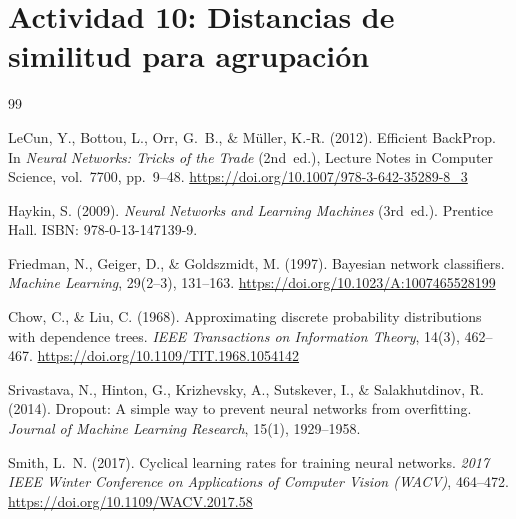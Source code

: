 \documentclass[12pt,a4paper]{article}
\theoremstyle{definition}
\theoremstyle{plain}
\theoremstyle{remark}
\begin{document}
\section{Actividad 10: Distancias de similitud para agrupación}


\clearpage


\begin{thebibliography}{99}


LeCun, Y., Bottou, L., Orr, G.~B., \& M\"uller, K.-R. (2012).
Efficient BackProp.
In \emph{Neural Networks: Tricks of the Trade} (2nd~ed.), Lecture Notes in Computer Science, vol.~7700, pp.~9--48.
\url{https://doi.org/10.1007/978-3-642-35289-8\_3}

Haykin, S. (2009).
\emph{Neural Networks and Learning Machines} (3rd~ed.).
Prentice Hall.
ISBN: 978-0-13-147139-9.

Friedman, N., Geiger, D., \& Goldszmidt, M. (1997).
Bayesian network classifiers.
\emph{Machine Learning}, 29(2--3), 131--163.
\url{https://doi.org/10.1023/A:1007465528199}

Chow, C., \& Liu, C. (1968).
Approximating discrete probability distributions with dependence trees.
\emph{IEEE Transactions on Information Theory}, 14(3), 462--467.
\url{https://doi.org/10.1109/TIT.1968.1054142}

Srivastava, N., Hinton, G., Krizhevsky, A., Sutskever, I., \& Salakhutdinov, R. (2014).
Dropout: A simple way to prevent neural networks from overfitting.
\emph{Journal of Machine Learning Research}, 15(1), 1929--1958.


Smith, L.~N. (2017).
Cyclical learning rates for training neural networks.
\emph{2017 IEEE Winter Conference on Applications of Computer Vision (WACV)}, 464--472.
\url{https://doi.org/10.1109/WACV.2017.58}


\end{thebibliography}
\end{document}
